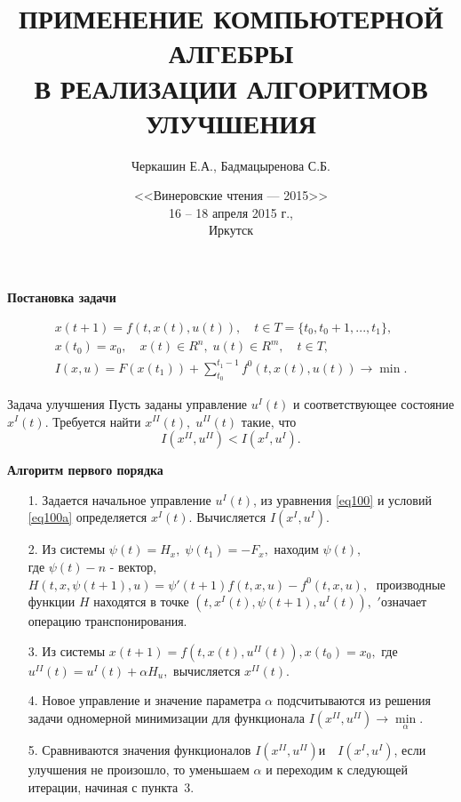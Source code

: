 \documentclass[10pt]{beamer}
\begin{document}
\title{ПРИМЕНЕНИЕ КОМПЬЮТЕРНОЙ АЛГЕБРЫ\\
В РЕАЛИЗАЦИИ АЛГОРИТМОВ УЛУЧШЕНИЯ}
\author{Черкашин Е.А., Бадмацыренова С.Б.}
\date[2015]{<<Винеровские чтения --- 2015>>
\\[0.3cm]
16 -- 18 апреля 2015 г.,\\
Иркутск
}
\maketitle

\begin{frame}{\textbf{Постановка задачи} }
\begin{block}{}
  \begin{gather}
x(t+1)=f(t,x(t),u(t)),\quad t \in T=\{t_0,t_0+1,...,t_1\},
	\label{eq100} \\
x(t_0)=x_0,\quad x(t)\in R^n,\; u(t) \in R^m,\quad t\in T,\label{eq100a} \\
I(x,u)=F(x(t_1))+ \sum_{t_0}^{t_1-1}f^0(t,x(t),u(t)) \to \min.
  \label{eq103}
  \end{gather}
\end{block}
\begin{block}{Задача улучшения}
  Пусть заданы управление $u^I(t)$ и соответствующее состояние $x^I(t)$. Требуется найти $x^{I\!I}(t),\; u^{I\!I}(t)$ такие, что 
\[
I(x^{I\!I},u^{I\!I}) < I(x^I,u^I).
\]
 \end{block}
\end{frame}
\begin{frame}{\textbf{Алгоритм первого порядка} }
\begin{block}{}
\begin{enumerate}
 \item[1.] Задается начальное управление $u^I(t)$, из уравнения \eqref{eq100} и условий \eqref{eq100a} определяется $x^I(t)$. Вычисляется $I(x^I,u^I).$
 \item[2.] Из системы $\psi(t)=H_x,\;\psi(t_1)=-F_x,$ находим $\psi(t),$\\ где $\psi(t) - n$ - вектор, $H(t,x,\psi(t+1),u)=\psi'(t+1)f(t,x,u)-f^{0}(t,x,u),\;$ производные функции $H$ находятся в точке $\left(t,x^{I}(t),\psi \left( t+1 \right),u^{I}(t)\right),$ \glqq$'$\grqq означает операцию  транспонирования. 
 \item[3.] Из системы $x(t+1)=f(t,x(t),u^{I\!I}(t)), x(t_0)=x_0,$ где $u^{I\!I}(t)=u^{I}(t)+\alpha H_u,$ вычисляется $x^{I\!I}(t).$
 \item[4.] Новое управление и значение параметра $\alpha$ подсчитываются из решения задачи одномерной минимизации для функционала $I(x^{I\!I},u^{I\!I})\to \min\limits_{\alpha}.$
 \item[5.] Сравниваются значения функционалов $I\left(x^{I\!I},u^{I\!I}\right) \mbox{и}\quad
I\left(x^{I},u^{I}\right)$, если улучшения не произошло, то уменьшаем $\alpha$ и переходим к следующей итерации, начиная с пункта~3.
\end{enumerate}
\end{block}
\end{frame}
\end{document}
